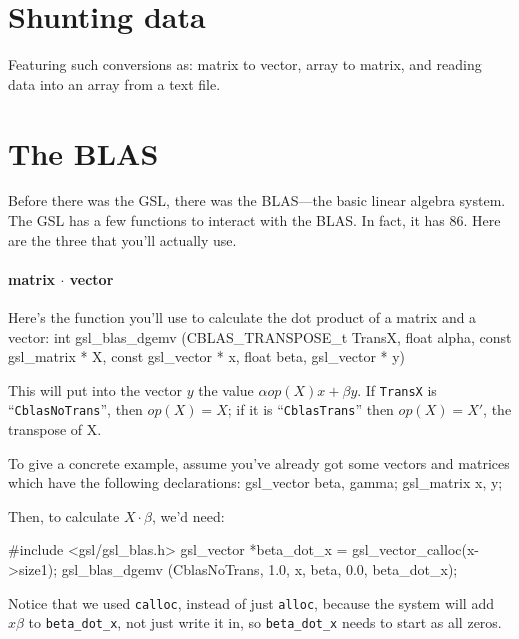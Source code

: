\section{Shunting data} \label{asst_conversions}  

Featuring such conversions as: matrix to vector, array to matrix, and reading data into an array from a
text file.


\section{The BLAS} 
Before there was the GSL, there was the BLAS---the basic linear algebra system. The GSL has a few
functions to interact with the BLAS. In fact, it has 86. Here are the three that you'll
actually use.

\paragraph{matrix $\cdot$ vector} Here's the function you'll use to calculate the dot product of a
matrix and a vector:
int gsl_blas_dgemv (CBLAS_TRANSPOSE_t TransX, float alpha, 
          const gsl_matrix * X, const gsl_vector * x, 
          float beta, gsl_vector * y)

This will put into the vector $y$ the value $\alpha op(X) x + \beta y$. 
If {\tt TransX} is ``{\tt CblasNoTrans}'',  then $op(X)=X$; if it is
``{\tt CblasTrans}'' then $op(X)=X'$, the transpose of X.


To give a concrete example, assume you've already got some vectors and matrices which have the following
declarations:
gsl_vector beta, gamma;     
gsl_matrix x, y;           

Then, to calculate $X\cdot \beta$, we'd need:

#include <gsl/gsl_blas.h>
gsl_vector *beta_dot_x      = gsl_vector_calloc(x->size1);
gsl_blas_dgemv (CblasNoTrans, 1.0, x, beta, 0.0, beta_dot_x);

Notice that we used {\tt calloc}, instead of just {\tt alloc}, because
the system will add $x\beta$ to {\tt beta\_dot\_x}, not just write it in,
so {\tt beta\_dot\_x} needs to start as all zeros.

